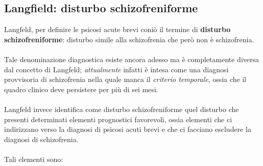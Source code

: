 \subsection{Langfield: disturbo schizofreniforme}

Langfeld, per definire le psicosi acute brevi coniò il termine di
\textbf{disturbo schizofreniforme}: disturbo simile alla schizofrenia
che però non è schizofrenia.
\\\\
Tale denominazione diagnostica esiste ancora adesso ma è completamente
diversa dal concetto di Langfeld; \emph{\emph{attualmente}} infatti è
intesa come una diagnosi provvisoria di schizofrenia nella quale manca
il \emph{criterio temporale}, ossia che il quadro clinico deve
persistere per più di sei mesi.
\\\\
Langfeld invece identifica come disturbo schizofreniforme quel disturbo
che presenti determinati elementi prognostici favorevoli, ossia elementi
che ci indirizzano verso la diagnosi di psicosi acuti brevi e che ci
facciano escludere la diagnosi di schizofrenia.
\\\\
Tali elementi sono:


